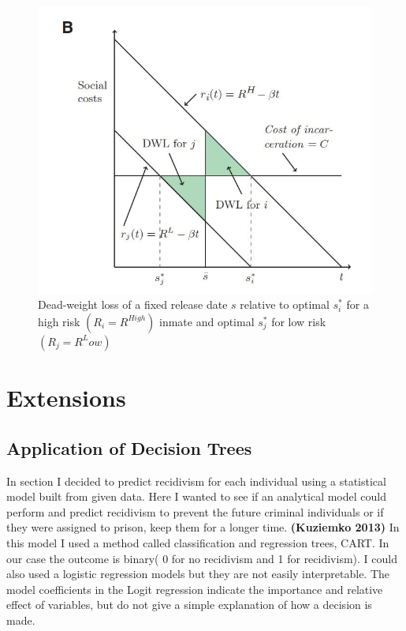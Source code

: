 \documentclass[a4paper,12pt]{article}
\begin{document}
\begin{figure}[h]
\centering
\includegraphics[scale=0.60]{fig2.JPG}
\caption{Dead-weight loss of a fixed release date $s$ relative to optimal $s^*_i$ for a high risk $(R_i = R^{High})$ inmate and optimal $s^*_j$ for low risk $(R_j = R^Low)$}
\label{fig:Figure 2}
\end{figure}

\newpage
\section{Extensions}
\subsection{Application of Decision Trees}
In section I decided to predict recidivism for each individual using a statistical model built from given data. Here I wanted to see if an analytical model could perform and predict recidivism to prevent the future criminal individuals or if they were assigned to prison, keep them for a longer time. \textbf{(Kuziemko 2013)}\cite{Kuziemko2013} In this model I used a method called classification and regression trees, CART. In our case the outcome is binary( 0 for no recidivism and 1 for recidivism). I could also used a logistic regression models but they are not easily interpretable. The model coefficients in the Logit regression indicate the importance and relative effect of variables, but do not give a simple explanation of how a decision is made. 
\end{document}
